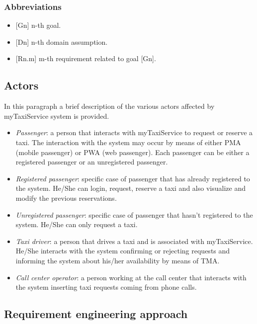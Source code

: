 \subsubsection{Abbreviations}
\begin{itemize}
\item {[}Gn{]} n-th goal.
\item {[}Dn{]} n-th domain assumption.
\item {[}Rn.m{]} m-th requirement related to goal {[}Gn{]}.
\end{itemize}

\subsection{Actors}

In this paragraph a brief description of the various actors affected
by myTaxiService system is provided.
\begin{itemize}
\item \emph{Passenger}: a person that interacts with myTaxiService to request
or reserve a taxi. The interaction with the system may occur by means
of either PMA (mobile passenger) or PWA (web passenger). Each passenger
can be either a registered passenger or an unregistered passenger.
\item \emph{Registered passenger}: specific case of passenger that has already
registered to the system. He/She can login, request, reserve a taxi
and also visualize and modify the previous reservations.
\item \emph{Unregistered passenger}: specific case of passenger that hasn't
registered to the system. He/She can only request a taxi.
\item \emph{Taxi driver}: a person that drives a taxi and is associated
with myTaxiService. He/She interacts with the system confirming or
rejecting requests and informing the system about his/her availability
by means of TMA.
\item \emph{Call center operator}: a person working at the call center that
interacts with the system inserting taxi requests coming from phone
calls. 
\end{itemize}

\subsection{Requirement engineering approach}

